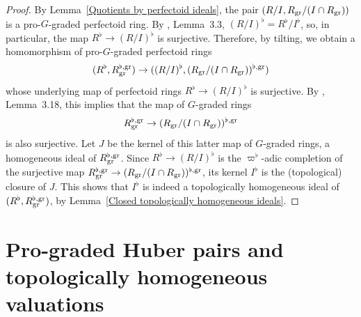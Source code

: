 \documentclass[12pt,twoside,a4paper]{article}
\theoremstyle{definition}
\theoremstyle{remark}
\newcommand\gr{{\rm gr}}
\begin{document}
\begin{proof}By Lemma~\ref{Quotients by perfectoid ideals}, the pair $(R/I, R_{\gr}/(I\cap R_{\gr}))$ is a pro-$G$-graded perfectoid ring. By \cite{Dine-Ishizuka23}, Lemma~3.3, $(R/I)^{\flat}=R^{\flat}/I^{\flat}$, so, in particular, the map $R^{\flat}\to (R/I)^{\flat}$ is surjective. Therefore, by tilting, we obtain a homomorphism of pro-$G$-graded perfectoid rings \begin{equation*}(R^{\flat}, R_{\gr}^{\flat,\gr})\to ((R/I)^{\flat}, (R_{\gr}/(I\cap R_{\gr}))^{\flat,\gr})\end{equation*}whose underlying map of perfectoid rings $R^{\flat}\to (R/I)^{\flat}$ is surjective. By \cite{Ishizuka-Yoshikawa25}, Lemma~3.18, this implies that the map of $G$-graded rings \begin{equation*}R_{\gr}^{\flat,\gr}\to (R_{\gr}/(I\cap R_{\gr}))^{\flat,\gr}\end{equation*}is also surjective. Let $J$ be the kernel of this latter map of $G$-graded rings, a homogeneous ideal of $R_{\gr}^{\flat,\gr}$. Since $R^{\flat}\to (R/I)^{\flat}$ is the $\varpi^{\flat}$-adic completion of the surjective map $R_{\gr}^{\flat,\gr}\to (R_{\gr}/(I\cap R_{\gr}))^{\flat,\gr}$, its kernel $I^{\flat}$ is the (topological) closure of $J$. This shows that $I^{\flat}$ is indeed a topologically homogeneous ideal of $(R^{\flat}, R_{\gr}^{\flat,\gr})$, by Lemma~\ref{Closed topologically homogeneous ideals}. \end{proof}

\section{Pro-graded Huber pairs and topologically homogeneous valuations}\label{sec:Huber pairs}
\end{document}
